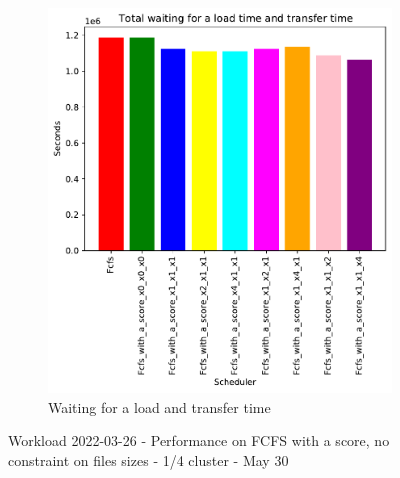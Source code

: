 \documentclass[a4paper]{article}
\begin{document}
\begin{figure}[H]
	\begin{subfigure}[b]{0.4\linewidth}\centering\includegraphics[width=1\linewidth]{MBSS/plot/FCFS_Score_2022-03-26->2022-03-26_Total_waiting_for_a_load_time_and_transfer_time_95_128_4_256_1_1024.pdf}\caption{Waiting for a load and transfer time}\end{subfigure}\caption{Workload 2022-03-26 - Performance on FCFS with a score, no constraint on files sizes - 1/4 cluster - May 30}\end{figure}
	
\end{document}
